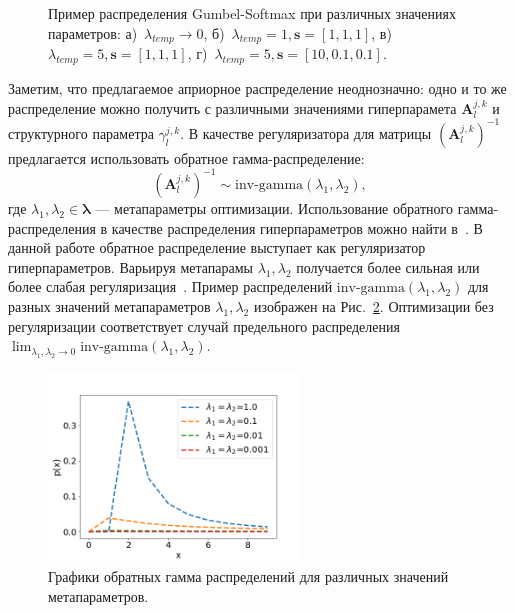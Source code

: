 \begin{figure}
\begin{minipage}[t]{.2\textwidth}
\subcaption{}
\end{minipage}

\caption{Пример распределения Gumbel-Softmax при различных значениях параметров: а)~$\lambda_{temp}\to0$, б)~$\lambda_{temp}=1, \mathbf{s}=[1,1,1]$, в)~$\lambda_{temp}=5, \mathbf{s}=[1,1,1]$, г)~$\lambda_{temp}=5, \mathbf{s}=[10,0.1,0.1].$}
\label{fig:gs}

\end{figure}


Заметим, что предлагаемое априорное распределение неоднозначно: одно и то же распределение  можно получить с различными значениями гиперпарамета $\mathbf{A}^{j,k}_l$ и структурного параметра $\gamma^{j,k}_l$. В качестве регуляризатора для матрицы $(\mathbf{A}^{j,k}_l)^{-1}$ предлагается использовать обратное гамма-распределение:
\[
    (\mathbf{A}^{j,k}_l)^{-1} \sim \text{inv-gamma}(\lambda_1,\lambda_2),
\]
где $\lambda_1,\lambda_2 \in \boldsymbol{\lambda}$ --- метапараметры оптимизации. 
Использование обратного гамма-распределения в качестве распределения гиперпараметров можно найти в~\cite{bishop,mackay}. В данной работе обратное распределение выступает как регуляризатор гиперпараметров.
Варьируя метапарамы $\lambda_1,\lambda_2$ получается  более сильная или более слабая регуляризация~\cite{rvm}. Пример распределений $\text{inv-gamma}(\lambda_1,\lambda_2)$ для разных значений метапараметров $\lambda_1,\lambda_2$ изображен на Рис.~\ref{fig:inv-gamma}. Оптимизации без регуляризации соответствует случай предельного распределения $\lim_{\lambda_1,\lambda_2\to 0}\text{inv-gamma}(\lambda_1, \lambda_2)$.

\begin{figure}
\centering
\includegraphics[width=0.6\textwidth]{plots/notebooks/invgamma.png}
\caption{Графики обратных гамма распределений для различных значений метапараметров.}
\label{fig:inv-gamma}
\end{figure}


